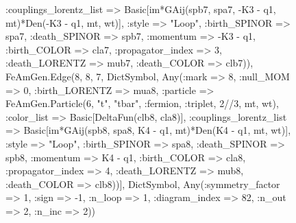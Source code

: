 \documentclass{revtex4}
\begin{document}
\begin{figure}[!htb]
\begin{center}
{:couplings_lorentz_list => Basic[im*GAij(spb7, spa7, -K3 - q1, mt)*Den(-K3 - q1, mt, wt)], :style => "Loop", :birth_SPINOR => spa7, :death_SPINOR => spb7, :momentum => -K3 - q1, :birth_COLOR => cla7, :propagator_index => 3, :death_LORENTZ => mub7, :death_COLOR => clb7)), FeAmGen.Edge(8, 8, 7, Dict{Symbol, Any}(:mark => 8, :null_MOM => 0, :birth_LORENTZ => mua8, :particle => FeAmGen.Particle(6, "t", "tbar", :fermion, :triplet, 2//3, mt, wt), :color_list => Basic[DeltaFun(clb8, cla8)], :couplings_lorentz_list => Basic[im*GAij(spb8, spa8, K4 - q1, mt)*Den(K4 - q1, mt, wt)], :style => "Loop", :birth_SPINOR => spa8, :death_SPINOR => spb8, :momentum => K4 - q1, :birth_COLOR => cla8, :propagator_index => 4, :death_LORENTZ => mub8, :death_COLOR => clb8))], Dict{Symbol, Any}(:symmetry_factor => 1, :sign => -1, :n_loop => 1, :diagram_index => 82, :n_out => 2, :n_inc => 2)) 
}
\end{center}
\end{figure}
\end{document}

